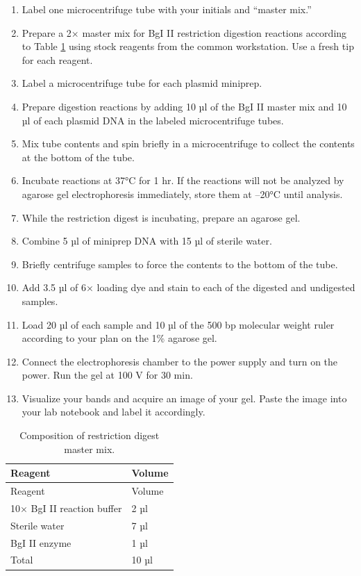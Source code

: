 \documentclass[]{book}
\providecommand{\tightlist}{%
  \setlength{\itemsep}{0pt}\setlength{\parskip}{0pt}}
\theoremstyle{definition}
\theoremstyle{definition}
\theoremstyle{definition}
\theoremstyle{remark}
\begin{document}
\begin{enumerate}
\def\labelenumi{\arabic{enumi}.}
\tightlist
\item
  Label one microcentrifuge tube with your initials and ``master mix.''
\item
  Prepare a 2× master mix for BgI II restriction digestion reactions
  according to Table \ref{tab:digest} using stock reagents from the
  common workstation. Use a fresh tip for each reagent.
\item
  Label a microcentrifuge tube for each plasmid miniprep.
\item
  Prepare digestion reactions by adding 10 µl of the BgI II master mix
  and 10 µl of each plasmid DNA in the labeled microcentrifuge tubes.
\item
  Mix tube contents and spin briefly in a microcentrifuge to collect the
  contents at the bottom of the tube.
\item
  Incubate reactions at 37°C for 1 hr. If the reactions will not be
  analyzed by agarose gel electrophoresis immediately, store them at
  --20°C until analysis.
\item
  While the restriction digest is incubating, prepare an agarose gel.
\item
  Combine 5 µl of miniprep DNA with 15 µl of sterile water.
\item
  Briefly centrifuge samples to force the contents to the bottom of the
  tube.
\item
  Add 3.5 µl of 6× loading dye and stain to each of the digested and
  undigested samples.
\item
  Load 20 µl of each sample and 10 µl of the 500 bp molecular weight
  ruler according to your plan on the 1\% agarose gel.
\item
  Connect the electrophoresis chamber to the power supply and turn on
  the power. Run the gel at 100 V for 30 min.
\item
  Visualize your bands and acquire an image of your gel. Paste the image
  into your lab notebook and label it accordingly.
\end{enumerate}

\begin{longtable}[]{@{}ll@{}}
\caption{\label{tab:digest} Composition of restriction digest master
mix.}\tabularnewline
\toprule
Reagent & Volume\tabularnewline
\midrule
\endfirsthead
\toprule
Reagent & Volume\tabularnewline
\midrule
\endhead
10× BgI II reaction buffer & 2 µl\tabularnewline
Sterile water & 7 µl\tabularnewline
BgI II enzyme & 1 µl\tabularnewline
Total & 10 µl\tabularnewline
\bottomrule
\end{longtable}
\end{document}
